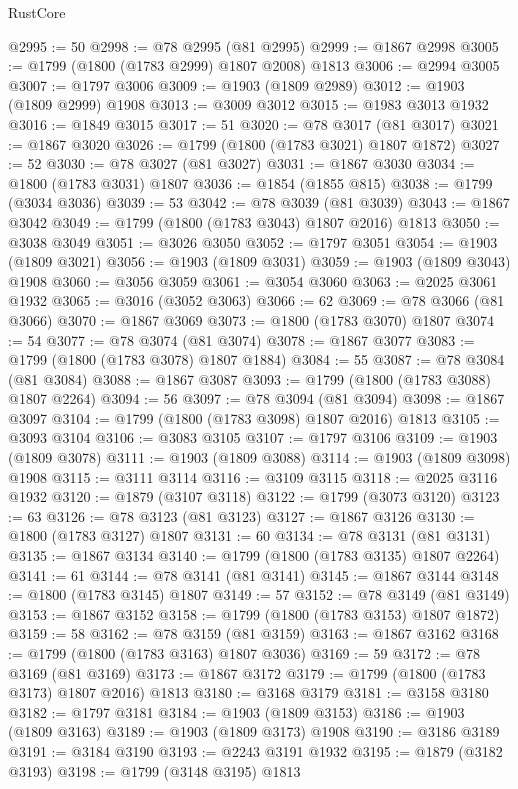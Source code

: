 \begin{lexlean}{RustCore}
\begin{coremodule}
@2995 := 50
@2998 := @78 @2995 (@81 @2995)
@2999 := @1867 @2998
@3005 := @1799 (@1800 (@1783 @2999) @1807 @2008) @1813
@3006 := @2994 @3005
@3007 := @1797 @3006
@3009 := @1903 (@1809 @2989)
@3012 := @1903 (@1809 @2999) @1908
@3013 := @3009 @3012
@3015 := @1983 @3013 @1932
@3016 := @1849 @3015
@3017 := 51
@3020 := @78 @3017 (@81 @3017)
@3021 := @1867 @3020
@3026 := @1799 (@1800 (@1783 @3021) @1807 @1872)
@3027 := 52
@3030 := @78 @3027 (@81 @3027)
@3031 := @1867 @3030
@3034 := @1800 (@1783 @3031) @1807
@3036 := @1854 (@1855 @815)
@3038 := @1799 (@3034 @3036)
@3039 := 53
@3042 := @78 @3039 (@81 @3039)
@3043 := @1867 @3042
@3049 := @1799 (@1800 (@1783 @3043) @1807 @2016) @1813
@3050 := @3038 @3049
@3051 := @3026 @3050
@3052 := @1797 @3051
@3054 := @1903 (@1809 @3021)
@3056 := @1903 (@1809 @3031)
@3059 := @1903 (@1809 @3043) @1908
@3060 := @3056 @3059
@3061 := @3054 @3060
@3063 := @2025 @3061 @1932
@3065 := @3016 (@3052 @3063)
@3066 := 62
@3069 := @78 @3066 (@81 @3066)
@3070 := @1867 @3069
@3073 := @1800 (@1783 @3070) @1807
@3074 := 54
@3077 := @78 @3074 (@81 @3074)
@3078 := @1867 @3077
@3083 := @1799 (@1800 (@1783 @3078) @1807 @1884)
@3084 := 55
@3087 := @78 @3084 (@81 @3084)
@3088 := @1867 @3087
@3093 := @1799 (@1800 (@1783 @3088) @1807 @2264)
@3094 := 56
@3097 := @78 @3094 (@81 @3094)
@3098 := @1867 @3097
@3104 := @1799 (@1800 (@1783 @3098) @1807 @2016) @1813
@3105 := @3093 @3104
@3106 := @3083 @3105
@3107 := @1797 @3106
@3109 := @1903 (@1809 @3078)
@3111 := @1903 (@1809 @3088)
@3114 := @1903 (@1809 @3098) @1908
@3115 := @3111 @3114
@3116 := @3109 @3115
@3118 := @2025 @3116 @1932
@3120 := @1879 (@3107 @3118)
@3122 := @1799 (@3073 @3120)
@3123 := 63
@3126 := @78 @3123 (@81 @3123)
@3127 := @1867 @3126
@3130 := @1800 (@1783 @3127) @1807
@3131 := 60
@3134 := @78 @3131 (@81 @3131)
@3135 := @1867 @3134
@3140 := @1799 (@1800 (@1783 @3135) @1807 @2264)
@3141 := 61
@3144 := @78 @3141 (@81 @3141)
@3145 := @1867 @3144
@3148 := @1800 (@1783 @3145) @1807
@3149 := 57
@3152 := @78 @3149 (@81 @3149)
@3153 := @1867 @3152
@3158 := @1799 (@1800 (@1783 @3153) @1807 @1872)
@3159 := 58
@3162 := @78 @3159 (@81 @3159)
@3163 := @1867 @3162
@3168 := @1799 (@1800 (@1783 @3163) @1807 @3036)
@3169 := 59
@3172 := @78 @3169 (@81 @3169)
@3173 := @1867 @3172
@3179 := @1799 (@1800 (@1783 @3173) @1807 @2016) @1813
@3180 := @3168 @3179
@3181 := @3158 @3180
@3182 := @1797 @3181
@3184 := @1903 (@1809 @3153)
@3186 := @1903 (@1809 @3163)
@3189 := @1903 (@1809 @3173) @1908
@3190 := @3186 @3189
@3191 := @3184 @3190
@3193 := @2243 @3191 @1932
@3195 := @1879 (@3182 @3193)
@3198 := @1799 (@3148 @3195) @1813

\end{coremodule}
\end{lexlean}
